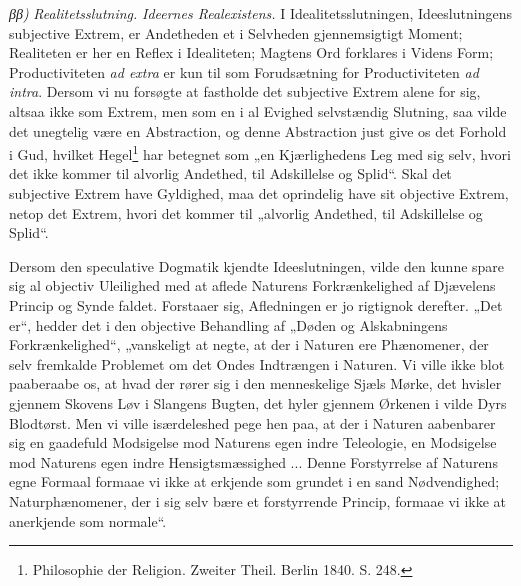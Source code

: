 \documentclass[12pt]{book}
\newcommand{\opage}[1]{\marginnote{\footnotesize\textit{[#1]}}}
\begin{document}
\textit{ββ)} \emph{Realitetsslutning.} \emph{Ideernes Realexistens.} I Idealitetsslutningen, Ideeslutningens subjective Extrem, er Andetheden et i Selvheden gjennemsigtigt Moment; Realiteten er her en Reflex i Idealiteten; Magtens Ord forklares i Videns Form; Productiviteten \textit{ad extra} er kun til som Forudsætning for Productiviteten \textit{ad intra}. Dersom vi nu forsøgte at fastholde det subjective Extrem alene for sig, altsaa ikke som Extrem, men som en i al Evighed selvstændig Slutning, saa vilde det unegtelig være en Abstraction, og denne Abstraction just give os det Forhold i Gud, hvilket Hegel\footnote{Philosophie der Religion. Zweiter Theil. Berlin 1840. S. 248.}%
{} har betegnet som „en Kjærlighedens Leg med sig selv, hvori det ikke kommer til alvorlig Andethed, til Adskillelse og Splid“. Skal det subjective Extrem have Gyldighed, maa det oprindelig have sit objective Extrem, netop det Extrem, hvori det kommer til „alvorlig Andethed, til Adskillelse og Splid“.

Dersom den speculative Dogmatik kjendte Ideeslutningen, vilde den kunne spare sig al objectiv Uleilighed med at aflede Naturens Forkrænkelighed af Djævelens Princip og Synde%
\opage{451}faldet. Forstaaer sig, Afledningen er jo rigtignok derefter. „Det er“, hedder det i den objective Behandling af „Døden og Alskabningens Forkrænkelighed“, „vanskeligt at negte, at der i Naturen ere Phænomener, der selv fremkalde Problemet om det Ondes Indtrængen i Naturen. Vi ville ikke blot paaberaabe os, at hvad der rører sig i den menneskelige Sjæls Mørke, det hvisler gjennem Skovens Løv i Slangens Bugten, det hyler gjennem Ørkenen i vilde Dyrs Blodtørst. Men vi ville isærdeleshed pege hen paa, at der i Naturen aabenbarer sig en gaadefuld Modsigelse mod Naturens egen indre Teleologie, en Modsigelse mod Naturens egen indre Hensigtsmæssighed ... Denne Forstyrrelse af Naturens egne Formaal formaae vi ikke at erkjende som grundet i en sand Nødvendighed; Naturphænomener, der i sig selv bære et forstyrrende Princip, formaae vi ikke at anerkjende som normale“.
\end{document}
